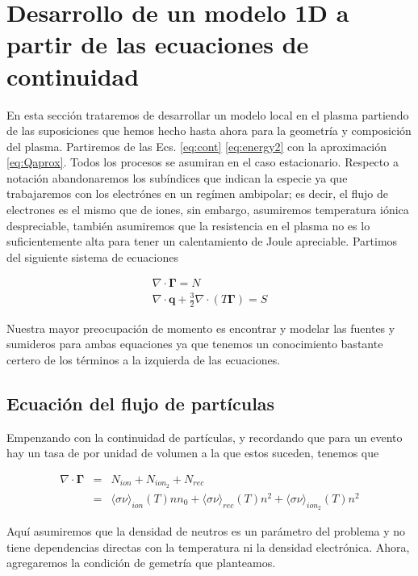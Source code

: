 \section{Desarrollo de un modelo 1D a partir de las ecuaciones de continuidad}

En esta secci\'on trataremos de desarrollar un modelo local en el plasma partiendo de las suposiciones que hemos hecho hasta ahora para la geometr\'ia y composici\'on del plasma. Partiremos de las Ecs. \eqref{eq:cont} \eqref{eq:energy2} con la aproximaci\'on \eqref{eq:Qaprox}. Todos los procesos se asumiran en el caso estacionario. Respecto a notaci\'on abandonaremos los sub\'indices que indican la especie ya que trabajaremos con los electr\'ones en un reg\'imen ambipolar; es decir, el flujo de electrones es el mismo que de iones, sin embargo, asumiremos temperatura i\'onica despreciable, tambi\'en asumiremos que la resistencia en el plasma no es lo suficientemente alta para tener un calentamiento de Joule apreciable. Partimos del siguiente sistema de ecuaciones 

\begin{eqnarray*}
  \nabla\cdot\pmb{\Gamma} = N\\
  \nabla\cdot\textbf{q} + \frac{3}{2}\nabla\cdot(T\pmb{\Gamma}) = S
\end{eqnarray*}

Nuestra mayor preocupaci\'on de momento es encontrar y modelar las fuentes y sumideros para ambas equaciones ya que tenemos un conocimiento bastante certero de los t\'erminos a la izquierda de las ecuaciones.

\subsection{Ecuaci\'on del flujo de part\'iculas}

Empenzando con la continuidad de part\'iculas, y recordando que para un evento hay un tasa de por unidad de volumen a la que estos suceden, tenemos que

\begin{eqnarray}
  \nabla\cdot\pmb{\Gamma} &=& N_{ion} + N_{ion_2} + N_{rec}\nonumber\\
  &=& \langle\sigma \nu\rangle_{ion}(T)nn_0 + \langle\sigma \nu\rangle_{rec}(T)n^2 + \langle\sigma \nu\rangle_{ion_2}(T)n^2
\end{eqnarray}

Aqu\'i asumiremos que la densidad de neutros es un par\'ametro del problema y no tiene dependencias directas con la temperatura ni la densidad electr\'onica. Ahora, agregaremos la condici\'on de gemetr\'ia que planteamos. 


